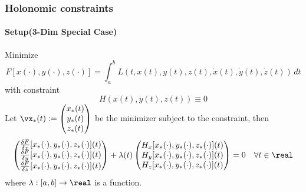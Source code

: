 \documentclass[11pt]{article}
\begin{document}
\subsubsection{Holonomic constraints}
\paragraph{Setup(3-Dim Special Case)}
Minimize
$$F[x(\cdot), y(\cdot), z(\cdot)] = \int_a^b L(t, x(t), y(t), z(t), \dot{x}(t), \dot{y}(t), \dot{z}(t))\, dt$$
with constraint
$$H(x(t), y(t), z(t)) \equiv 0$$
Let $\vx_*(t) := \begin{pmatrix}
	x_*(t) \\
	y_*(t) \\
	z_*(t)
\end{pmatrix}$ be the minimizer subject to the constraint, then
$$\begin{pmatrix}
	\frac{\delta F}{\delta x}[x_*(\cdot), y_*(\cdot), z_*(\cdot)](t) \\
	\frac{\delta F}{\delta y}[x_*(\cdot), y_*(\cdot), z_*(\cdot)](t) \\
	\frac{\delta F}{\delta z}[x_*(\cdot), y_*(\cdot), z_*(\cdot)](t) \\
\end{pmatrix} + \lambda(t)
\begin{pmatrix}
	H_x[x_*(\cdot), y_*(\cdot), z_*(\cdot)](t)\\
	H_y[x_*(\cdot), y_*(\cdot), z_*(\cdot)](t)\\
	H_z[x_*(\cdot), y_*(\cdot), z_*(\cdot)](t)\\
\end{pmatrix} = 0 \quad \forall t\in \real
$$
where $\lambda: [a,b] \rightarrow \real$ is a function.
	
	
	
	
	
	
	
	
	
	
	
	
	
	
	
	
	
	
	
	
	
	
	
	
	
\end{document}
